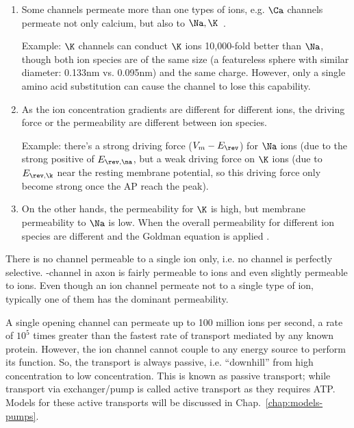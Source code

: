 \begin{enumerate}

  \item  Some channels permeate more than one types of ions, e.g. $\Ca$ channels
  permeate not only calcium, but also to $\Na,
  \K$~\citep{meves1973cic,reuter1977sic}. 
  
  
Example: $\K$ channels can conduct $\K$ ions 10,000-fold better than $\Na$,
though both ion species are of the same size (a featureless sphere with
similar diameter: 0.133nm vs. 0.095nm) and the same charge. However, only a
single amino acid substitution can cause the channel to lose this capability.
  
  \item As the ion concentration gradients are different for different ions, the
  driving force or the permeability are different between ion species.

  Example: there's a strong driving force ($V_m-E_\rev$) for $\Na$
  ions (due to the strong positive of $E_{\rev,\na}$, but a weak driving force
  on $\K$ ions (due to $E_{\rev,\k}$ near the resting membrane potential, so
  this driving force only become strong once the AP reach the peak).

  \item On the other hands, the permeability for $\K$ is high, but membrane
  permeability to $\Na$ is low. When the overall permeability
  for different ion species are different and the Goldman equation is applied
  \citep{goldman1943pir}.

\end{enumerate}

\begin{mdframed}

   There is no channel permeable to a single ion only,
  i.e. no channel is perfectly selective. -channel in axon is fairly
  permeable to  ions and even slightly permeable to  ions.
Even though an ion channel permeate not to a single type of ion, typically
one of them has the dominant permeability.


  A single opening channel can permeate up to 100 million ions per
  second, a rate of $10^5$ times greater than the fastest rate of
  transport mediated by any known protein. However, the ion channel
  cannot couple to any energy source to perform its function. So, the
  transport is always passive, i.e. ``downhill'' from high
  concentration to low concentration. This is known as passive
  transport; while transport via exchanger/pump is called active
  transport as they requires ATP. Models for these active transports will be
  discussed in Chap.~\ref{chap:models-pumps}.
\end{mdframed}


